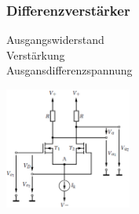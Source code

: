             \subsubsection{Differenzverstärker}
            \begin{minipage}[T]{14cm}
                Ausgangswiderstand
                \hspace{10.6mm}\\
                Verstärkung
                \hspace{23.3mm}\\
                Ausgansdifferenzspannung
                \hspace{1.7mm}
                
            \end{minipage}
            \begin{minipage}[T]{5cm}
                \includegraphics[height=4cm]{./images/MOSFET_Diffamp.png}
            \end{minipage}